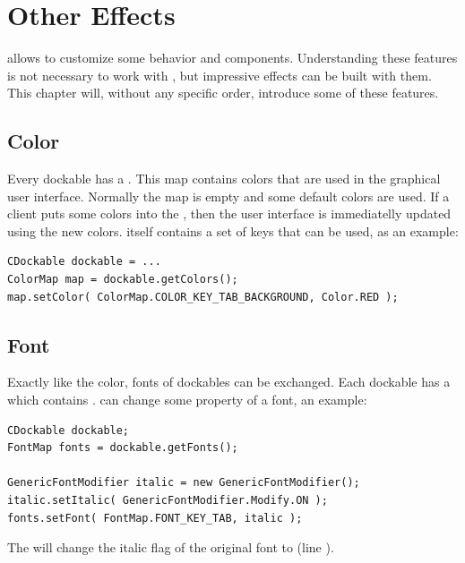  \section{Other Effects}
 allows to customize some behavior and components. Understanding these features is not necessary to work with , but impressive effects can be built with them. This chapter will, without any specific order, introduce some of these features.

\subsection{Color}
Every dockable has a . This map contains colors that are used in the graphical user interface. Normally the map is empty and some default colors are used. If a client puts some colors into the , then the user interface is immediatelly updated using the new colors.  itself contains a set of keys that can be used, as an example:
\begin{lstlisting}
CDockable dockable = ...
ColorMap map = dockable.getColors();
map.setColor( ColorMap.COLOR_KEY_TAB_BACKGROUND, Color.RED );
\end{lstlisting}



\subsection{Font}
Exactly like the color, fonts of dockables can be exchanged. Each dockable has a  which contains .  can change some property of a font, an example:
\begin{lstlisting}
CDockable dockable;
FontMap fonts = dockable.getFonts();

GenericFontModifier italic = new GenericFontModifier();
italic.setItalic( GenericFontModifier.Modify.ON );
fonts.setFont( FontMap.FONT_KEY_TAB, italic );
\end{lstlisting}
The   will change the italic flag of the original font to  (line ).

